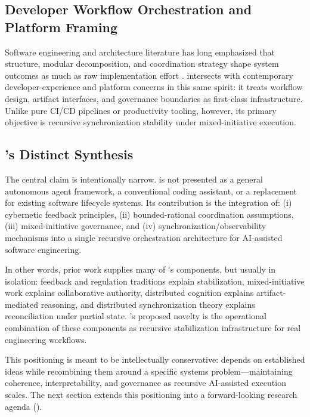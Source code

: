 \subsection{Developer Workflow Orchestration and Platform Framing}

Software engineering and architecture literature has long emphasized that structure, modular decomposition, and coordination strategy shape system outcomes as much as raw implementation effort \cite{Parnas1972Modularization,Brooks1987NoSilverBullet}.  intersects with contemporary developer-experience and platform concerns in this same spirit: it treats workflow design, artifact interfaces, and governance boundaries as first-class infrastructure. Unlike pure CI/CD pipelines or productivity tooling, however, its primary objective is recursive synchronization stability under mixed-initiative execution.

\subsection{'s Distinct Synthesis}

The central claim is intentionally narrow.  is not presented as a general autonomous agent framework, a conventional coding assistant, or a replacement for existing software lifecycle systems. Its contribution is the integration of: (i) cybernetic feedback principles, (ii) bounded-rational coordination assumptions, (iii) mixed-initiative governance, and (iv) synchronization/observability mechanisms into a single recursive orchestration architecture for AI-assisted software engineering.

In other words, prior work supplies many of 's components, but usually in isolation: feedback and regulation traditions explain stabilization, mixed-initiative work explains collaborative authority, distributed cognition explains artifact-mediated reasoning, and distributed synchronization theory explains reconciliation under partial state. 's proposed novelty is the operational combination of these components as recursive stabilization infrastructure for real engineering workflows.

This positioning is meant to be intellectually conservative:  depends on established ideas while recombining them around a specific systems problem---maintaining coherence, interpretability, and governance as recursive AI-assisted execution scales. The next section extends this positioning into a forward-looking research agenda ().
